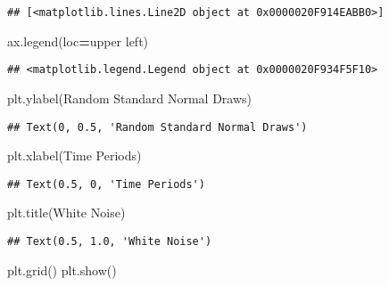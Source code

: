 \documentclass[
]{book}
\newenvironment{Shaded}{\begin{snugshade}}{\end{snugshade}}
\newcommand{\NormalTok}[1]{#1}
\newcommand{\OperatorTok}[1]{\textcolor[rgb]{0.81,0.36,0.00}{\textbf{#1}}}
\newcommand{\StringTok}[1]{\textcolor[rgb]{0.31,0.60,0.02}{#1}}
\begin{document}
\begin{verbatim}
## [<matplotlib.lines.Line2D object at 0x0000020F914EABB0>]
\end{verbatim}

\begin{Shaded}
\begin{Highlighting}[]
\NormalTok{ax.legend(loc}\OperatorTok{=}\StringTok{\textquotesingle{}upper left\textquotesingle{}}\NormalTok{)}
\end{Highlighting}
\end{Shaded}

\begin{verbatim}
## <matplotlib.legend.Legend object at 0x0000020F934F5F10>
\end{verbatim}

\begin{Shaded}
\begin{Highlighting}[]
\NormalTok{plt.ylabel(}\StringTok{\textquotesingle{}Random Standard Normal Draws\textquotesingle{}}\NormalTok{)}
\end{Highlighting}
\end{Shaded}

\begin{verbatim}
## Text(0, 0.5, 'Random Standard Normal Draws')
\end{verbatim}

\begin{Shaded}
\begin{Highlighting}[]
\NormalTok{plt.xlabel(}\StringTok{\textquotesingle{}Time Periods\textquotesingle{}}\NormalTok{)}
\end{Highlighting}
\end{Shaded}

\begin{verbatim}
## Text(0.5, 0, 'Time Periods')
\end{verbatim}

\begin{Shaded}
\begin{Highlighting}[]
\NormalTok{plt.title(}\StringTok{\textquotesingle{}White Noise\textquotesingle{}}\NormalTok{)}
\end{Highlighting}
\end{Shaded}

\begin{verbatim}
## Text(0.5, 1.0, 'White Noise')
\end{verbatim}

\begin{Shaded}
\begin{Highlighting}[]
\NormalTok{plt.grid()}
\NormalTok{plt.show()}
\end{Highlighting}
\end{Shaded}
\end{document}

